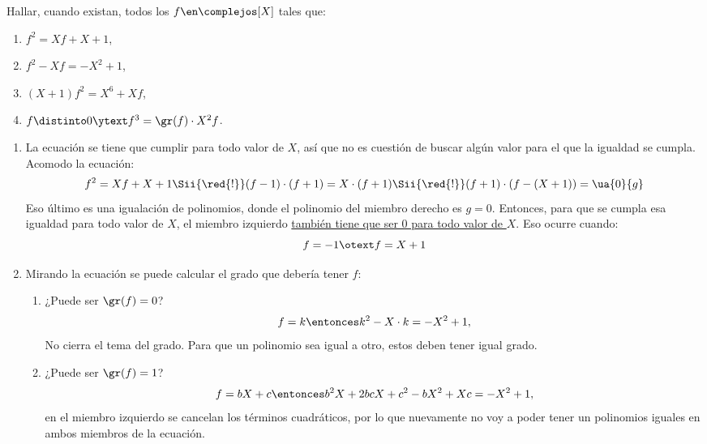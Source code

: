 \begin{enunciado}{\ejercicio}
  Hallar, cuando existan, todos los $f \en \complejos[X]$ tales que:
  \begin{multicols}{2}
    \begin{enumerate}[label=\roman*)]
      \item $f^2 = Xf + X + 1$,
      \item $f^2 - Xf = - X^2 + 1$,
      \item $(X+1)f^2 = X^6 + Xf$,
      \item $f \distinto 0 \ytext f^3 = \gr(f) \cdot X^2f$.
    \end{enumerate}
  \end{multicols}
\end{enunciado}

\begin{enumerate}[label=\roman*)]
  \item
        La ecuación se tiene que cumplir para todo valor de $X$, así que no es cuestión de buscar algún valor para el que la igualdad se cumpla.
        Acomodo la ecuación:
        $$
          f^2 = Xf + X + 1
          \Sii{\red{!}}
          (f-1) \cdot (f + 1) = X \cdot (f + 1)
          \Sii{\red{!}}
          (f+1) \cdot (f - (X + 1)) = \ua{0}{g}
        $$
        Eso último es una igualación de polinomios, donde el polinomio del miembro derecho es $g=0$. Entonces, para que
        se cumpla esa igualdad para todo valor de $X$, el miembro izquierdo \ul{también tiene que ser 0 para todo valor de $X$}.
        Eso ocurre cuando:
        $$
          f = -1 \otext f = X + 1
        $$

  \item Mirando la ecuación se puede calcular el grado que debería tener $f$:
        \begin{enumerate}[label=\tiny\faIcon{calculator}$_{\arabic*}$)]
          \item ¿Puede ser $\gr(f) = 0$?
                $$
                  f = k \entonces k^2 - X \cdot k = -X^2 + 1,
                $$
                No cierra el tema del grado. Para que un polinomio sea igual a otro, estos deben tener igual grado.
          \item ¿Puede ser $\gr(f) = 1$?
                $$
                  f = bX + c \entonces b^2X + 2bcX + c^2 - bX^2 + Xc = -X^2 + 1,
                $$
                en el miembro izquierdo se cancelan los términos cuadráticos, por lo que nuevamente no voy a poder tener un polinomios iguales
                en ambos miembros de la ecuación.


\end{enumerate}
\end{enumerate}
